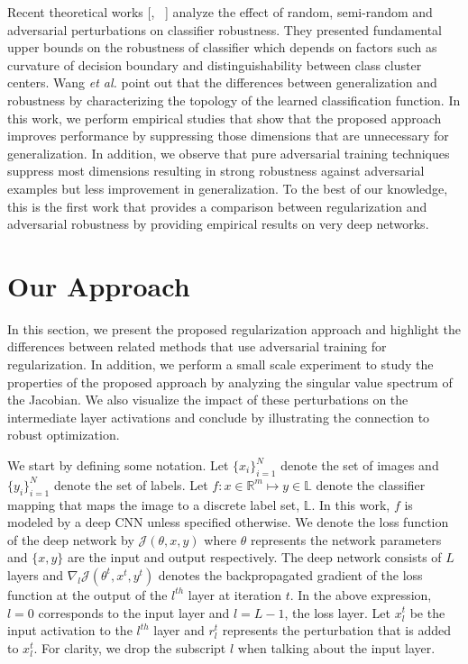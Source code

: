 \documentclass[letterpaper]{article} %
\begin{document}
Recent theoretical works [\cite{fawzi2015analysis}, ~\cite{fawzi2016robustness}] analyze the effect of random, semi-random and adversarial perturbations on classifier robustness. They presented fundamental upper bounds on the robustness of classifier which depends on factors such as curvature of decision boundary and distinguishability between class cluster centers. Wang \emph{et al.} \cite{WangGQ16} point out that the differences between generalization and robustness by characterizing the topology of the learned classification function. In this work, we perform empirical studies that show that the proposed approach improves performance by suppressing those dimensions that are unnecessary for generalization. In addition, we observe that pure adversarial training techniques suppress most dimensions resulting in strong robustness against adversarial examples but less improvement in generalization. To the best of our knowledge, this is the first work that provides a comparison between regularization and adversarial robustness by providing empirical results on very deep networks. 



\section{Our Approach}\label{sec:method}
In this section, we present the proposed regularization approach and highlight the  differences between related methods that use adversarial training for regularization. In addition, we perform a small scale experiment to study the properties of the proposed approach by analyzing the singular value spectrum of the Jacobian. We also visualize the impact of these perturbations on the intermediate layer activations and conclude by illustrating the connection to robust optimization.

We start by defining some notation. Let $\{x_i\}_{i=1}^{N}$ denote the set of images and $\{y_i\}_{i=1}^{N}$ denote the set of labels. Let $f: x \in \mathbb{R}^{m} \mapsto y \in \mathbb{L}$ denote the classifier mapping that maps the image to a discrete label set, $\mathbb{L}$. In this work, $f$ is modeled by a deep CNN unless specified otherwise. We denote the loss function of the deep network by $\mathcal{J}(\theta,x,y)$ where $\theta$ represents the network parameters and $\{x,y\}$ are the input and output respectively. The deep network consists of $L$ layers and $\nabla_{l}\mathcal{J}(\theta^{t},x^{t},y^{t})$ denotes the backpropagated gradient of the loss function at the output of the ${l}^{th}$ layer at iteration $t$. In the above expression, $l=0$ corresponds to the input layer and $l=L-1$, the loss layer. Let $x^{t}_{l}$ be the input activation to the $l^{th}$ layer and $r^{t}_{l}$ represents the perturbation that is added to $x^{t}_{l}$. For clarity, we drop the subscript $l$ when talking about the input layer. %
\end{document}
